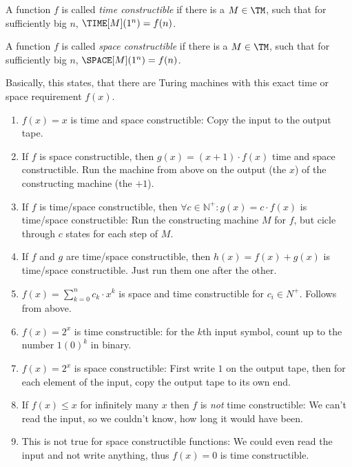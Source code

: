 \begin{defn}
	A function $f$ is called \emph{time constructible}\/ if there is a 
	$M\in\TM$, such that for sufficiently big $n$, $\TIME[M](1^n) = f(n)$.

	A function $f$ is called \emph{space constructible}\/ if there is a $M\in\TM$, 
	such that for sufficiently big $n$, $\SPACE[M](1^n)=f(n)$.

	Basically, this states, that there are Turing machines with this exact time 
	or space requirement $f(x)$.
\end{defn}
\begin{example}
	\begin{enumerate}
		\item $f(x)=x$ is time and space 
			constructible: Copy the input to the output tape.
		\item If $f$ is space constructible, then $g(x)=(x+1)\cdot f(x)$ time and space
			constructible. Run the machine from above on the output (the $x$) of the
			constructing machine (the $+1$).
		\item If $f$ is time/space constructible, then 
			$\forall c\in \mathbb{N^+}: g(x)=c\cdot f(x)$ is time/space 
			constructible: Run the constructing machine $M$ for $f$, but cicle through $c$ 
			states for each step of $M$.
		\item If $f$ and $g$ are time/space constructible, then $h(x) = f(x)+g(x)$ is time/space
			constructible. Just run them one after the other. 
		\item $f(x)=\sum^n_{k=0}c_k\cdot x^k$ is space and time constructible for 
			$c_i\in N^+$. Follows from above.
		\item $f(x)=2^x$ is time constructible: for the $k$th input symbol, count up 
			to the number $1(0)^k$ in binary.
		\item $f(x)=2^x$ is space constructible: First write $1$ on the output 
			tape, then for each element of the input, copy the output tape to its own end.
		\item If $f(x)\leq x$ for infinitely many $x$ then $f$ is \emph{not}\/ time
			constructible: We can't read the input, so we couldn't know, how long it
			would have been.
		\item This is not true for space constructible functions: We could even 
			read the input and not write anything, thus $f(x)=0$ is time constructible.
	\end{enumerate}
\end{example}

